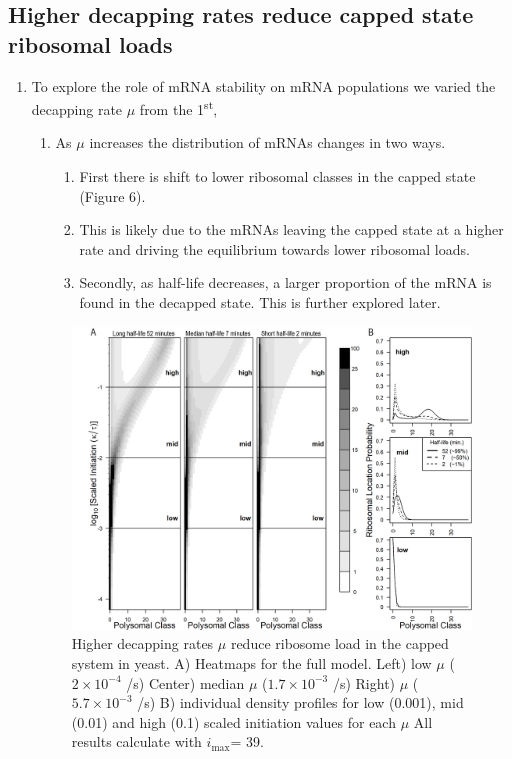 \documentclass[review]{elsarticle}
\newcommand{\imax}{\ensuremath{{i_{\max}}}\xspace}
\begin{document}
\subsection{Higher decapping rates reduce capped state ribosomal loads }
\begin{enumerate}
\item To explore the role of mRNA stability on mRNA populations we varied the decapping rate $\mu$ from the 1\textsuperscript{st}, 
\begin{enumerate}
  50\textsuperscript{th} and 99\textsuperscript{th} percentile values as determined from  Presnyak 2015.
  \item As $\mu$ increases the distribution of mRNAs changes in two ways. 
  \begin{enumerate}
     \item First there is shift to lower ribosomal classes in the capped state (Figure 6).
     \item This is likely due to the mRNAs leaving the capped state at a higher rate and driving the equilibrium towards lower ribosomal loads. 
     \item Secondly, as half-life decreases, a larger proportion of the mRNA is found in the decapped state. This is further explored later. 
  \end{enumerate}
\end{enumerate}
\begin{figure}[!ht]
\centering
\includegraphics[width=120mm]{Images/2023-07-09_Figure2_Marking_Rate_range_medianlength_with_labels.png}
\caption{Higher decapping rates $\mu$ reduce ribosome load in the capped system in yeast.  A)  Heatmaps for the full model. Left) low $\mu$ ($2\times 10^{-4}$ /s) Center) median $\mu$ ($1.7\times 10^{-3}$ /s) Right) $\mu$ ($5.7\times 10^{-3}$ /s)  B) individual density profiles for low (0.001), mid (0.01) and high (0.1) scaled initiation values for each $\mu$ All results calculate with \imax = 39.}
\end{figure}
\clearpage


\end{enumerate}
\end{document}
